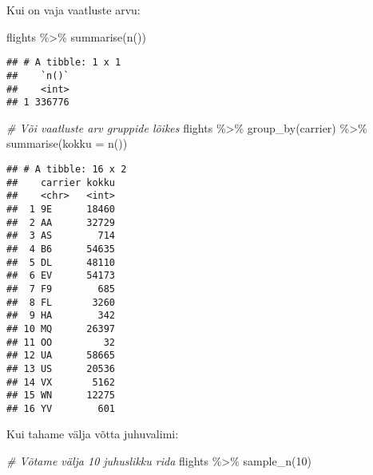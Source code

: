 \documentclass[
]{book}
\newenvironment{Shaded}{\begin{snugshade}}{\end{snugshade}}
\newcommand{\AttributeTok}[1]{\textcolor[rgb]{0.77,0.63,0.00}{#1}}
\newcommand{\CommentTok}[1]{\textcolor[rgb]{0.56,0.35,0.01}{\textit{#1}}}
\newcommand{\DecValTok}[1]{\textcolor[rgb]{0.00,0.00,0.81}{#1}}
\newcommand{\FunctionTok}[1]{\textcolor[rgb]{0.00,0.00,0.00}{#1}}
\newcommand{\NormalTok}[1]{#1}
\newcommand{\SpecialCharTok}[1]{\textcolor[rgb]{0.00,0.00,0.00}{#1}}
\begin{document}
Kui on vaja vaatluste arvu:

\begin{Shaded}
\begin{Highlighting}[]
\NormalTok{flights }\SpecialCharTok{\%\textgreater{}\%} 
  \FunctionTok{summarise}\NormalTok{(}\FunctionTok{n}\NormalTok{())}
\end{Highlighting}
\end{Shaded}

\begin{verbatim}
## # A tibble: 1 x 1
##    `n()`
##    <int>
## 1 336776
\end{verbatim}

\begin{Shaded}
\begin{Highlighting}[]
\CommentTok{\# Või vaatluste arv gruppide lõikes}
\NormalTok{flights }\SpecialCharTok{\%\textgreater{}\%} 
  \FunctionTok{group\_by}\NormalTok{(carrier) }\SpecialCharTok{\%\textgreater{}\%} 
  \FunctionTok{summarise}\NormalTok{(}\AttributeTok{kokku =} \FunctionTok{n}\NormalTok{())}
\end{Highlighting}
\end{Shaded}

\begin{verbatim}
## # A tibble: 16 x 2
##    carrier kokku
##    <chr>   <int>
##  1 9E      18460
##  2 AA      32729
##  3 AS        714
##  4 B6      54635
##  5 DL      48110
##  6 EV      54173
##  7 F9        685
##  8 FL       3260
##  9 HA        342
## 10 MQ      26397
## 11 OO         32
## 12 UA      58665
## 13 US      20536
## 14 VX       5162
## 15 WN      12275
## 16 YV        601
\end{verbatim}

Kui tahame välja võtta juhuvalimi:

\begin{Shaded}
\begin{Highlighting}[]
\CommentTok{\# Võtame välja 10 juhuslikku rida}
\NormalTok{flights }\SpecialCharTok{\%\textgreater{}\%} 
  \FunctionTok{sample\_n}\NormalTok{(}\DecValTok{10}\NormalTok{)}
\end{Highlighting}
\end{Shaded}
\end{document}
